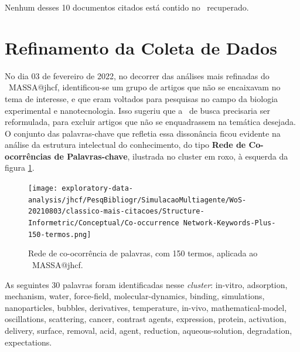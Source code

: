 Nenhum desses 10 documentos citados está contido no \dataset\   recuperado.



\section{Refinamento da Coleta de Dados}

No dia 03 de fevereiro de 2022, no decorrer das análises mais refinadas do \dataset\ MASSA@jhcf, identificou-se um grupo de artigos que não se encaixavam no tema de interesse, e que eram voltados para pesquisas no campo da biologia experimental e nanotecnologia. Isso sugeriu que a \query\  de busca precisaria ser reformulada, para excluir artigos que não se enquadrassem na temática desejada.
O conjunto das palavras-chave que refletia essa dissonância ficou evidente na análise da estrutura intelectual do conhecimento, do tipo \textbf{Rede de Co-ocorrências de Palavras-chave}, ilustrada no cluster em roxo, à esquerda da figura \ref{fig:MASSA@jhcf:redecoocorr-150-termos}.

\begin{figure}[htp]
    \centering
    \texttt{[image: exploratory-data-analysis/jhcf/PesqBibliogr/SimulacaoMultiagente/WoS-20210803/classico-mais-citacoes/Structure-Informetric/Conceptual/Co-occurrence Network-Keywords-Plus-150-termos.png]}
    \caption{Rede de co-ocorrência de palavras, com 150 termos, aplicada ao \dataset\   MASSA@jhcf.}
    \label{fig:MASSA@jhcf:redecoocorr-150-termos}
\end{figure}

As seguintes 30 palavras foram identificadas nesse \textit{cluster}:
in-vitro,
adsorption,
mechanism,
water,
force-field,
molecular-dynamics,
binding,
simulations,
nanoparticles,
bubbles,
derivatives,
temperature,
in-vivo,
mathematical-model,
oscillations,
scattering,
cancer,
contrast agents,
expression,
protein,
activation,
delivery,
surface,
removal,
acid,
agent,
reduction,
aqueous-solution,
degradation,
expectations.

